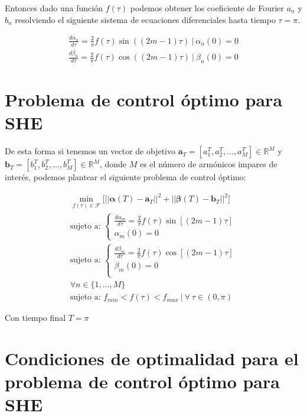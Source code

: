 Entonces dado una función $f(\tau)$ podemos obtener los coeficiente de Fourier $a_n$ y $b_n$ resolviendo el siguiente sistema de ecuaciones diferenciales hasta tiempo $\tau=\pi$.

\begin{gather}
    \frac{d \alpha_n}{d\tau} = \frac{2}{\pi}f(\tau) \sin((2m-1)\tau) \ | \ \alpha_n(0) = 0 \\
    \frac{d \beta_n}{d\tau} = \frac{2}{\pi}f(\tau) \cos((2m-1)\tau) \ | \ \beta_n(0) = 0
\end{gather}

\section{Problema de control óptimo para SHE}
De esta forma si tenemos un vector de objetivo $\bm{a}_T = [a_1^T,a_2^T,\dots,a_{M}^T] \in \mathbb{R}^M$ y  $\bm{b}_T = [b_1^T,b_2^T,\dots,b_{M}^T] \in \mathbb{R}^M$, donde $M$ es el número de armónicos impares de interés, podemos plantear el siguiente problema de control óptimo:

\begin{gather}
    \min_{f(\tau) \in \mathcal{F}} \big[  || \bm{\alpha}(T) - \bm{a}_T ||^2  + || \bm{\beta}(T) - \bm{b}_T ||^2 \big] \\
    \text{sujeto a: }
    \begin{cases}
        \displaystyle \frac{d \alpha_m}{d\tau} = \frac{2}{\pi}  f(\tau) \sin[(2m-1) \tau ] \\
         \alpha_m(0) = 0       
    \end{cases}
        \\ 
    \text{sujeto a: }
    \begin{cases}
        \displaystyle \frac{d \beta_m}{d\tau}  = \frac{2}{\pi}  f(\tau) \cos[(2m-1) \tau ] \\ 
        \beta_m(0) = 0   \\
    \end{cases} \\
    \forall n \in \{ 1, \dots,M\}  \\ 
    \text{sujeto a: } f_{min} < f(\tau) < f_{max} \ | \ \forall \ \tau \in (0,\pi)  
\end{gather}

Con tiempo final $T = \pi$


\section{Condiciones de optimalidad  para el problema de control óptimo para SHE} 



